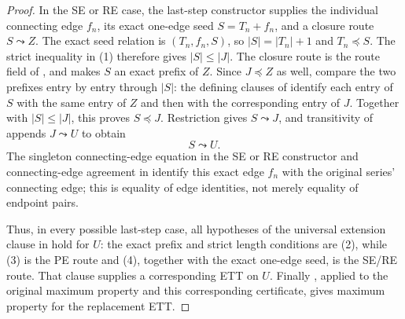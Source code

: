 \begin{proof}
In the SE or RE case, the last-step constructor supplies the individual
connecting edge $f_n$, its exact one-edge seed $S=T_n+f_n$, and a closure
route $S\leadsto Z$.  The exact seed relation is
$(T_n,f_n,S)$, so
$|S|=|T_n|+1$ and $T_n\preccurlyeq S$.  The strict inequality in (1)
therefore gives $|S|\leq |J|$.  The closure route is the route field of
, and
 makes $S$ an exact
prefix of $Z$.  Since $J\preccurlyeq Z$ as well, compare the two prefixes
entry by entry through $|S|$: the defining clauses of
 identify each entry of $S$ with the
same entry of $Z$ and then with the corresponding entry of $J$.  Together
with $|S|\leq|J|$, this proves $S\preccurlyeq J$.  Restriction gives
$S\leadsto J$, and transitivity of
 appends $J\leadsto U$ to obtain
\[
                         S\leadsto U.                  \tag{4}
\]
The singleton connecting-edge equation in the SE or RE constructor and
connecting-edge agreement in
 identify this exact edge
$f_n$ with the original series' connecting edge; this is equality of edge
identities, not merely equality of endpoint pairs.

Thus, in every possible last-step case, all hypotheses of the universal
extension clause in  hold for $U$: the exact prefix
and strict length conditions are (2), while (3) is the PE route and (4),
together with the exact one-edge seed, is the SE/RE route.  That clause
supplies a corresponding ETT on $U$.  Finally
, applied to the original maximum
property and this corresponding certificate, gives maximum property for
the replacement ETT.
\end{proof}
